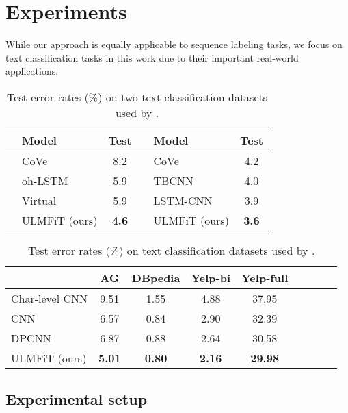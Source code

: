 \documentclass[11pt,a4paper]{article}
\begin{document}
\section{Experiments} \label{sec:experiments}

While our approach is equally applicable to sequence labeling tasks, we focus on text classification tasks in this work due to their important real-world applications.

\begin{table*}
  \centering
  \setlength\tabcolsep{3.65pt}
\begin{tabular}{llcllc}
    \toprule
 & Model & Test &  & Model & Test\\
\midrule
 \parbox[t]{2mm}{} & CoVe \cite{Mccann2017} & 8.2 & \parbox[t]{2mm}{} & CoVe \cite{Mccann2017} & 4.2 \\
 & oh-LSTM~\cite{johnson2016supervised} & 5.9 & & TBCNN~\cite{mou2015discriminative}& 4.0 \\
 & Virtual~\cite{miyato2016adversarial} & 5.9 & & LSTM-CNN~\cite{zhou2016text} & 3.9 \\
 & ULMFiT (ours) & \textbf{4.6} & & ULMFiT (ours) & \textbf{3.6} \\
\bottomrule
  \end{tabular}
      \caption{Test error rates (\%) on two text classification datasets used by .}
  \label{tab:results-mccann}
\end{table*}

\begin{table*}
\centering
\begin{tabular}{l c c c c c c c c}
\toprule
 & AG & DBpedia & Yelp-bi & Yelp-full \\
 \midrule
Char-level CNN \cite{zhang2015character} & 9.51 & 1.55 & 4.88 & 37.95 \\
CNN \cite{johnson2016supervised} & 6.57 & 0.84 & 2.90 & 32.39 \\
DPCNN \cite{johnson2017deep} & 6.87 & 0.88 & 2.64 & 30.58 \\
ULMFiT (ours) & \textbf{5.01} & \textbf{0.80} & \textbf{2.16} & \textbf{29.98} & \\
\bottomrule
\end{tabular}
\caption{Test error rates (\%) on text classification datasets used by .}
\label{tab:results-zhang}
\end{table*}

\subsection{Experimental setup}
\end{document}
